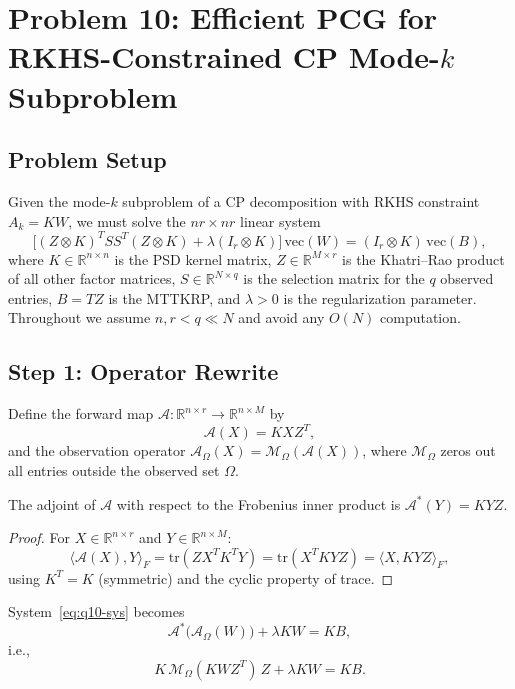 \section{Problem 10: Efficient PCG for RKHS-Constrained CP Mode-$k$ Subproblem}\label{sec:q10}

\subsection*{Problem Setup}
Given the mode-$k$ subproblem of a CP decomposition with RKHS constraint $A_k = KW$, we must solve the $nr\times nr$ linear system
\begin{equation}\label{eq:q10-sys}
\bigl[(Z\otimes K)^T S S^T (Z\otimes K) + \lambda(I_r\otimes K)\bigr]\,\mathrm{vec}(W)
= (I_r\otimes K)\,\mathrm{vec}(B),
\end{equation}
where $K\in\mathbb R^{n\times n}$ is the PSD kernel matrix, $Z\in\mathbb R^{M\times r}$ is the Khatri--Rao product of all other factor matrices, $S\in\mathbb R^{N\times q}$ is the selection matrix for the $q$ observed entries, $B=TZ$ is the MTTKRP, and $\lambda>0$ is the regularization parameter.
Throughout we assume $n,r<q\ll N$ and avoid any $O(N)$ computation.

\subsection*{Step 1: Operator Rewrite}

Define the forward map $\mathcal A\colon\mathbb R^{n\times r}\to\mathbb R^{n\times M}$ by
\[
\mathcal A(X) = K X Z^T,
\]
and the observation operator $\mathcal A_\Omega(X)=\mathcal M_\Omega(\mathcal A(X))$, where $\mathcal M_\Omega$ zeros out all entries outside the observed set $\Omega$.

\begin{lemma}[Adjoint]\label{lem:q10-adj}
The adjoint of $\mathcal A$ with respect to the Frobenius inner product is $\mathcal A^*(Y) = K Y Z$.
\end{lemma}
\begin{proof}
For $X\in\mathbb R^{n\times r}$ and $Y\in\mathbb R^{n\times M}$:
\[
\langle \mathcal A(X), Y\rangle_F
= \mathrm{tr}(Z X^T K^T Y)
= \mathrm{tr}(X^T K Y Z)
= \langle X, K Y Z\rangle_F,
\]
using $K^T=K$ (symmetric) and the cyclic property of trace.
\end{proof}

System~\eqref{eq:q10-sys} becomes
\begin{equation}\label{eq:q10-op}
\mathcal A^*\bigl(\mathcal A_\Omega(W)\bigr) + \lambda K W = K B,
\end{equation}
i.e.,
\[
K\,\mathcal M_\Omega(K W Z^T)\,Z + \lambda K W = K B.
\]

